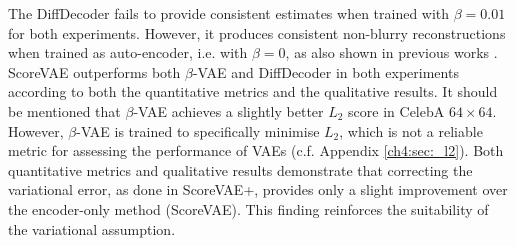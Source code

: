 The DiffDecoder fails to provide consistent estimates when trained with $\beta=0.01$ for both experiments. However, it produces consistent non-blurry reconstructions when trained as auto-encoder, i.e. with $\beta=0$, as also shown in previous works \cite{preechakul2022diffusion_decoder, yang2023ldiffusion_decoder_compression}. ScoreVAE outperforms both $\beta$-VAE and DiffDecoder in both experiments according to both the quantitative metrics and the qualitative results. It should be mentioned that $\beta$-VAE achieves a slightly better $L_2$ score in CelebA $64\times 64$. However, 
$\beta$-VAE is trained to specifically minimise $L_2$, which is not a reliable metric for assessing the performance of VAEs (c.f. Appendix \ref{ch4:sec:_l2}). Both quantitative metrics and qualitative results demonstrate that correcting the variational error, as done in ScoreVAE+, provides only a slight improvement over the encoder-only method (ScoreVAE). This finding reinforces the suitability of the variational assumption.



